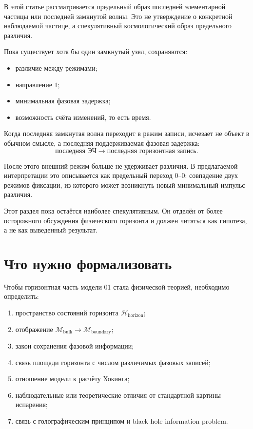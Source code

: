 \documentclass[11pt,a4paper]{article}
\newcommand{\memory}{\mathcal{M}}
\newcommand{\bulk}{\mathrm{bulk}}
\newcommand{\boundary}{\mathrm{boundary}}
\begin{document}
В этой статье рассматривается предельный образ последней элементарной частицы или последней замкнутой волны. Это не утверждение о конкретной наблюдаемой частице, а спекулятивный космологический образ предельного различия.

Пока существует хотя бы один замкнутый узел, сохраняются:
\begin{itemize}
\item различие между режимами;
\item направление $1$;
\item минимальная фазовая задержка;
\item возможность счёта изменений, то есть время.
\end{itemize}

Когда последняя замкнутая волна переходит в режим записи, исчезает не объект в обычном смысле, а последняя поддерживаемая фазовая задержка:
\begin{equation}
\text{последняя ЭЧ} \longrightarrow \text{последняя горизонтная запись}.
\end{equation}

После этого внешний режим больше не удерживает различия. В предлагаемой интерпретации это описывается как предельный переход $0$--$0$: совпадение двух режимов фиксации, из которого может возникнуть новый минимальный импульс различия.

Этот раздел пока остаётся наиболее спекулятивным. Он отделён от более осторожного обсуждения физического горизонта и должен читаться как гипотеза, а не как выведенный результат.

\section{Что нужно формализовать}

Чтобы горизонтная часть модели 01 стала физической теорией, необходимо определить:
\begin{enumerate}
\item пространство состояний горизонта $\mathcal{H}_{\mathrm{horizon}}$;
\item отображение $\memory_{\bulk}\to\memory_{\boundary}$;
\item закон сохранения фазовой информации;
\item связь площади горизонта с числом различимых фазовых записей;
\item отношение модели к расчёту Хокинга;
\item наблюдательные или теоретические отличия от стандартной картины испарения;
\item связь с голографическим принципом и black hole information problem.
\end{enumerate}
\end{document}

